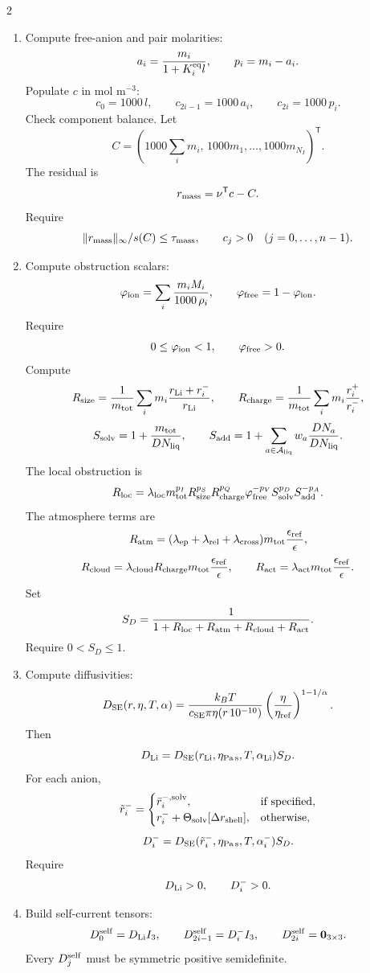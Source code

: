 \documentclass[10pt]{article}
\newcommand{\T}{\mathsf{T}}
\newcommand{\zero}{\mathbf{0}}
\begin{document}
\begin{multicols}{2}
\begin{enumerate}[label=\textbf{A\arabic*.}]
\item Compute free-anion and pair molarities:
\[
a_i=\frac{m_i}{1+K_i^{\rm eq}l},
\qquad
p_i=m_i-a_i.
\]
Populate \(c\) in mol m\(^{-3}\):
\[
c_0=1000\,l,
\qquad
c_{2i-1}=1000\,a_i,
\qquad
c_{2i}=1000\,p_i.
\]
Check component balance. Let
\[
C=
\left(
1000\sum_i m_i,\,
1000m_1,\ldots,1000m_{N_I}
\right)^\T.
\]
The residual is
\[
r_{\rm mass}=\nu^\T c-C.
\]
Require
\[
\|r_{\rm mass}\|_\infty/s(C)\le\tau_{\rm mass},
\qquad
c_j>0\quad(j=0,\ldots,n-1).
\]

\item Compute obstruction scalars:
\[
\varphi_{\rm ion}
=
\sum_i\frac{m_iM_i}{1000\,\rho_i},
\qquad
\varphi_{\rm free}=1-\varphi_{\rm ion}.
\]
Require
\[
0\le\varphi_{\rm ion}<1,
\qquad
\varphi_{\rm free}>0.
\]
Compute
\[
R_{\rm size}
=
\frac{1}{m_{\rm tot}}
\sum_i m_i\frac{r_{\rm Li}+r_i^-}{r_{\rm Li}},
\qquad
R_{\rm charge}
=
\frac{1}{m_{\rm tot}}
\sum_i m_i\frac{r_i^+}{r_i^-},
\]
\[
S_{\rm solv}=1+\frac{m_{\rm tot}}{DN_{\rm liq}},
\qquad
S_{\rm add}
=
1+\sum_{a\in\mathcal A_{\rm liq}}w_a\frac{DN_a}{DN_{\rm liq}}.
\]
The local obstruction is
\[
R_{\rm loc}
=
\lambda_{\rm loc}
m_{\rm tot}^{p_I}
R_{\rm size}^{p_S}
R_{\rm charge}^{p_Q}
\varphi_{\rm free}^{-p_V}
S_{\rm solv}^{p_D}
S_{\rm add}^{-p_A}.
\]
The atmosphere terms are
\[
R_{\rm atm}
=
(\lambda_{\rm ep}+\lambda_{\rm rel}+\lambda_{\rm cross})
m_{\rm tot}\frac{\epsilon_{\rm ref}}{\epsilon},
\]
\[
R_{\rm cloud}
=
\lambda_{\rm cloud}R_{\rm charge}m_{\rm tot}
\frac{\epsilon_{\rm ref}}{\epsilon},
\qquad
R_{\rm act}
=
\lambda_{\rm act}m_{\rm tot}\frac{\epsilon_{\rm ref}}{\epsilon}.
\]
Set
\[
S_D
=
\frac{1}{1+R_{\rm loc}+R_{\rm atm}+R_{\rm cloud}+R_{\rm act}}.
\]
Require \(0<S_D\le1\).

\item Compute diffusivities:
\[
D_{\rm SE}(r,\eta,T,\alpha)
=
\frac{k_BT}{c_{\rm SE}\pi\eta(r\,10^{-10})}
\left(\frac{\eta}{\eta_{\rm ref}}\right)^{1-1/\alpha}.
\]
Then
\[
D_{\rm Li}
=
D_{\rm SE}(r_{\rm Li},\eta_{\rm Pa\,s},T,\alpha_{\rm Li})S_D.
\]
For each anion,
\[
\tilde r_i^-
=
\begin{cases}
\bar r_i^{-,{\rm solv}}, & \text{if specified},\\
r_i^-+\Theta_{\rm solv}[\Delta r_{\rm shell}], & \text{otherwise},
\end{cases}
\]
\[
D_i^-
=
D_{\rm SE}(\tilde r_i^-,\eta_{\rm Pa\,s},T,\alpha_i^-)S_D.
\]
Require
\[
D_{\rm Li}>0,
\qquad
D_i^->0.
\]

\item Build self-current tensors:
\[
D_0^{\rm self}=D_{\rm Li}I_3,
\qquad
D_{2i-1}^{\rm self}=D_i^-I_3,
\qquad
D_{2i}^{\rm self}=\zero_{3\times3}.
\]
Every \(D_j^{\rm self}\) must be symmetric positive semidefinite.


\end{enumerate}
\end{multicols}
\end{document}

